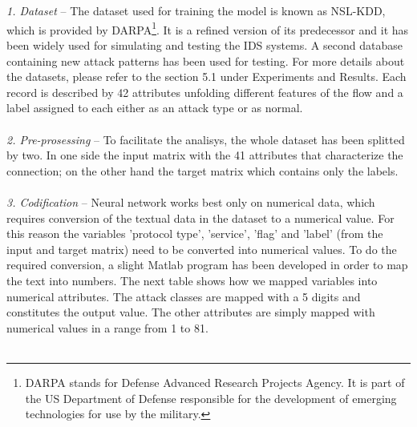 \documentclass[twocolumn,11pt]{asme2ej}
\begin{document}
\\\\
\textit{1. Dataset} -- The dataset used for training the model is known as NSL-KDD, which is provided by DARPA\footnote{DARPA stands for Defense Advanced Research Projects Agency. It is part of the US Department of Defense responsible for the development of emerging technologies for use by the military.}. It is a refined version of its predecessor and it has been widely used for simulating and testing the IDS systems. A second database containing new attack patterns has been used for testing. For more details about the datasets, please refer to the section 5.1 under Experiments and Results. Each record is described by 42 attributes unfolding different features of the flow and a label assigned to each either as an attack type or as normal.\\\\
\textit{2. Pre-prosessing} -- To facilitate the analisys, the whole dataset has been splitted by two. In one side the input matrix with the 41 attributes that characterize the connection; on the other hand the target matrix which contains only the labels.\\\\
\textit{3. Codification} -- Neural network works best only on numerical data, which requires conversion of the textual data in the dataset to a numerical value. For this reason the variables 'protocol type', 'service', 'flag' and 'label' (from the input and target matrix) need to be converted into numerical values. To do the required conversion, a slight Matlab program has been developed in order to map the text into numbers. The next table shows how we mapped variables into numerical attributes. The attack classes are mapped with a 5 digits and constitutes the output value. The other attributes are simply mapped with numerical values in a range from 1 to 81.
\\\\
\end{document}
